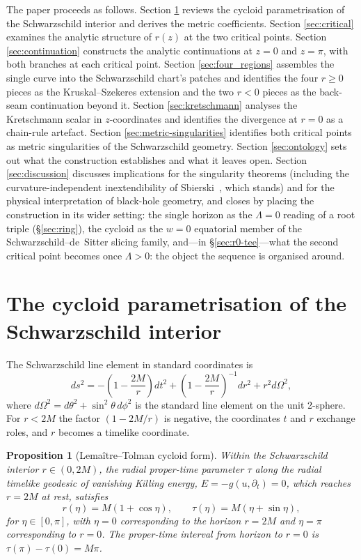 \documentclass[11pt,a4paper]{article}
\newtheorem{proposition}[theorem]{Proposition}
\theoremstyle{definition}
\begin{document}
The paper proceeds as follows. Section \ref{sec:cycloid} reviews the cycloid parametrisation of the Schwarzschild interior and derives the metric coefficients. Section \ref{sec:critical} examines the analytic structure of $r(z)$ at the two critical points. Section \ref{sec:continuation} constructs the analytic continuations at $z=0$ and $z=\pi$, with both branches at each critical point. Section \ref{sec:four_regions} assembles the single curve into the Schwarzschild chart's patches and identifies the four $r \geq 0$ pieces as the Kruskal--Szekeres extension and the two $r<0$ pieces as the back-seam continuation beyond it. Section \ref{sec:kretschmann} analyses the Kretschmann scalar in $z$-coordinates and identifies the divergence at $r=0$ as a chain-rule artefact. Section \ref{sec:metric-singularities} identifies both critical points as metric singularities of the Schwarzschild geometry. Section \ref{sec:ontology} sets out what the construction establishes and what it leaves open. Section \ref{sec:discussion} discusses implications for the singularity theorems (including the curvature-independent inextendibility of Sbierski~\cite{sbierski2018}, which stands) and for the physical interpretation of black-hole geometry, and closes by placing the construction in its wider setting: the single horizon as the $\Lambda=0$ reading of a root triple (\S\ref{sec:ring}), the cycloid as the $w=0$ equatorial member of the Schwarzschild--de~Sitter slicing family, and---in \S\ref{sec:r0-tee}---what the second critical point becomes once $\Lambda>0$: the object the sequence is organised around.

\section{The cycloid parametrisation of the Schwarzschild interior}\label{sec:cycloid}

The Schwarzschild line element in standard coordinates is
\begin{equation}
ds^2 = -\left(1 - \frac{2M}{r}\right)dt^2 + \left(1 - \frac{2M}{r}\right)^{-1} dr^2 + r^2 d\Omega^2,
\end{equation}
where $d\Omega^2 = d\theta^2 + \sin^2\theta\, d\phi^2$ is the standard line element on the unit 2-sphere. For $r < 2M$ the factor $(1 - 2M/r)$ is negative, the coordinates $t$ and $r$ exchange roles, and $r$ becomes a timelike coordinate.

\begin{proposition}[Lemaître--Tolman cycloid form]\label{prop:cycloid}
Within the Schwarzschild interior $r \in (0, 2M)$, the radial proper-time parameter $\tau$ along the radial timelike geodesic of vanishing Killing energy, $E=-g(u,\partial_t)=0$, which reaches $r=2M$ at rest, satisfies
\begin{equation}\label{eq:cycloid_pair}
r(\eta) = M(1 + \cos \eta), \qquad \tau(\eta) = M(\eta + \sin \eta),
\end{equation}
for $\eta \in [0, \pi]$, with $\eta = 0$ corresponding to the horizon $r = 2M$ and $\eta = \pi$ corresponding to $r=0$. The proper-time interval from horizon to $r=0$ is $\tau(\pi) - \tau(0) = M\pi$.
\end{proposition}
\end{document}
